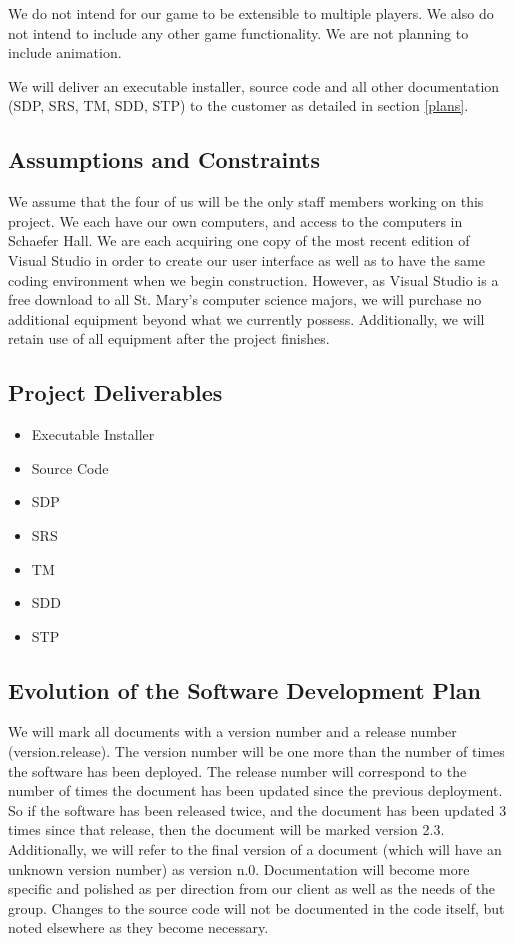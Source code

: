 \documentclass{article}
\begin{document}
We do not intend for our game to be extensible to multiple players.  We also do not intend to include any other game functionality.  We are not planning to include animation.

We will deliver an executable installer, source code and all other documentation (SDP, SRS, TM, SDD, STP) to the customer as detailed in section \ref{plans}.
\subsection{Assumptions and Constraints}
We assume that the four of us will be the only staff members working on this project.  We each have our own computers, and access to the computers in Schaefer Hall.  We are each acquiring one copy of the most recent edition of Visual Studio in order to create our user interface as well as to have the same coding environment when we begin construction.  However, as Visual Studio is a free download to all St. Mary's computer science majors, we will purchase no additional equipment beyond what we currently possess.   Additionally, we will retain use of all equipment after the project finishes.
\subsection{Project Deliverables}
\begin{itemize}
\item Executable Installer
\item Source Code
\item SDP
\item SRS
\item TM
\item SDD
\item STP
\end{itemize}
\subsection{Evolution of the Software Development Plan}
We will mark all documents with a version number and a release number (version.release).  The version number will be one more than the number of times the software has been deployed.  The release number will correspond to the number of times the document has been updated since the previous deployment.  So if the software has been released twice, and the document has been updated 3 times since that release, then the document will be marked version 2.3.  Additionally, we will refer to the final version of a document (which will have an unknown version number) as version n.0.  Documentation will become more specific and polished as per direction from our client as well as the needs of the group.  Changes to the source code will not be documented in the code itself, but noted elsewhere as they become necessary.
\end{document}
